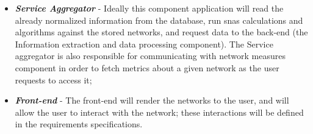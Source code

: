 \begin{itemize}
    \item \textbf{\textit{Service Aggregator}} - Ideally this component application will read the already normalized information from the database, run \glspl{sna} calculations and algorithms against the stored networks, and request data to the back-end (the Information extraction and data processing component). The Service aggregator is also responsible for communicating with network measures component in order to fetch metrics about a given network as the user requests to access it;
    \item \textbf{\textit{Front-end}} - The front-end will render the networks to the user, and will allow the user to interact with the network; these interactions will be defined in the requirements specifications.
\end{itemize}
